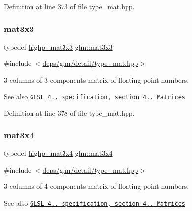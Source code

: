 Definition at line 373 of file type\+\_\+mat.\+hpp.

\mbox{\label{group__core__types_ga6fecca6a869070b6bf8acb44ce1c2af3}} 
\subsubsection{\texorpdfstring{mat3x3}{mat3x3}}
{\footnotesize\ttfamily typedef \hyperlink{group__core__precision_ga83105b0c326393a133a43c426aae2a9c}{highp\+\_\+mat3x3} \hyperlink{group__core__types_ga6fecca6a869070b6bf8acb44ce1c2af3}{glm\+::mat3x3}}



{\ttfamily \#include $<$\hyperlink{type__mat_8hpp}{deps/glm/detail/type\+\_\+mat.\+hpp}$>$}

3 columns of 3 components matrix of floating-\/point numbers.

\begin{DoxySeeAlso}{See also}
\href{http://www.opengl.org/registry/doc/GLSLangSpec.4.20.8.pdf}{\tt G\+L\+SL 4.. specification, section 4.. Matrices} 
\end{DoxySeeAlso}


Definition at line 378 of file type\+\_\+mat.\+hpp.

\mbox{\label{group__core__types_ga5524ae15d7fc00a68b8e0e3a0733cc2a}} 
\subsubsection{\texorpdfstring{mat3x4}{mat3x4}}
{\footnotesize\ttfamily typedef \hyperlink{group__core__precision_ga201566a8dbec6e27bec9e8e96ed4cdb6}{highp\+\_\+mat3x4} \hyperlink{group__core__types_ga5524ae15d7fc00a68b8e0e3a0733cc2a}{glm\+::mat3x4}}



{\ttfamily \#include $<$\hyperlink{type__mat_8hpp}{deps/glm/detail/type\+\_\+mat.\+hpp}$>$}

3 columns of 4 components matrix of floating-\/point numbers.

\begin{DoxySeeAlso}{See also}
\href{http://www.opengl.org/registry/doc/GLSLangSpec.4.20.8.pdf}{\tt G\+L\+SL 4.. specification, section 4.. Matrices} 
\end{DoxySeeAlso}


